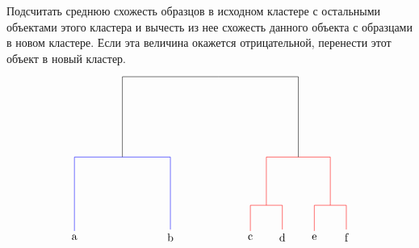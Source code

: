 \documentclass[12pt, a4paper]{article}
\begin{document}
Подсчитать среднюю схожесть образцов в исходном кластере с остальными объектами этого кластера и вычесть из нее схожесть данного объекта с образцами в новом кластере. Если эта величина окажется отрицательной, перенести
этот объект в новый кластер.
\[
\begin{tikzpicture}
\node (a) at (-6,0) {a};
\node (b) at (-3,0) {b};
\node (c) at (-0.5,0) {c};
\node (d) at (0.5,0) {d};
\node (e) at (1.5,0) {e};
\node (f) at (2.5,0) {f};

\node[blue] (ab) at (-4.5,2.5) {};
\node (cd) at (0,1) {};
\node (ef) at (2,1) {};
\node (cdef) at (1,2.5) {};
\node (all) at (-1.5,5) {};

\draw[blue]  (a) |- (ab.center);
\draw[blue]  (b) |- (ab.center);
\draw[red]  (c) |- (cd.center);
\draw[red]  (d) |- (cd.center);
\draw[red]  (e) |- (ef.center);
\draw[red]  (f) |- (ef.center);

\draw[red]  (cd.center) |- (cdef.center);
\draw[red]  (ef.center) |- (cdef.center);
\draw  (ab.center) |- (all.center);
\draw  (cdef.center) |- (all.center);
\end{tikzpicture}
\]


\end{document}
